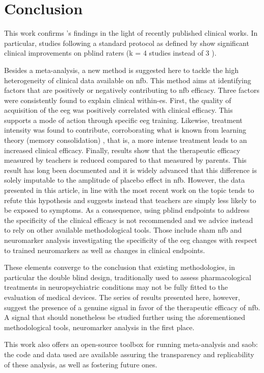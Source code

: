 

\section{Conclusion}

This work confirms \citet{Cortese2016}'s findings in the light of recently published clinical works.
In particular, studies following a standard protocol as defined by \citet{Arns2014} show significant 
clinical improvements on \gls{pblind} raters (k = 4 studies instead of 3 \citet{Cortese2016}).

Besides a meta-analysis, a new method is suggested here to tackle the high heterogeneity of clinical data 
available on \gls{nfb}. This method aims at identifying factors that are positively or negatively contributing 
to \gls{nfb} efficacy. Three factors were consistently found to explain clinical within-\gls{es}. First, the 
quality of acquisition of the \gls{eeg} was positively correlated with clinical efficacy. This supports a mode of 
action through specific \gls{eeg} training. Likewise, treatment intensity was found to contribute, corroborating what 
is known from learning theory (memory consolidation) \citep{Mowrer1960}, that is, a more intense treatment leads to 
an increased clinical efficacy. Finally, results show that the therapeutic efficacy measured by teachers is reduced 
compared to that measured by parents. This result has long been documented and it is widely advanced that this 
difference is solely imputable to the amplitude of placebo effect in \gls{nfb}. However, the data presented in this article, 
in line with the most recent work on the topic \citep{Sollie2013, Narad2015, Minder2018} 
tends to refute this hypothesis and suggests instead that teachers are simply less likely to be exposed to symptoms. 
As a consequence, using \gls{pblind} endpoints to address the specificity of the clinical efficacy is not recommended 
and we advice instead to rely on other available methodological tools. Those include sham \gls{nfb} and neuromarker 
analysis investigating the specificity of the \gls{eeg} changes with respect to trained neuromarkers as well as changes 
in clinical endpoints.

These elements converge to the conclusion that existing methodologies, in particular the double blind design, 
traditionally used to assess pharmacological treatments in neuropsychiatric conditions may not be fully fitted to the evaluation 
of medical devices. The series of results presented here, however, suggest the presence of a genuine signal in favor of 
the therapeutic efficacy of \gls{nfb}. A signal that should nonetheless be studied further using the aforementioned methodological 
tools, neuromarker analysis in the first place.

This work also offers an open-source toolbox for running meta-analysis and \gls{saob}: the code and data used are available 
assuring the transparency and replicability of these analysis, as well as fostering future ones. 

